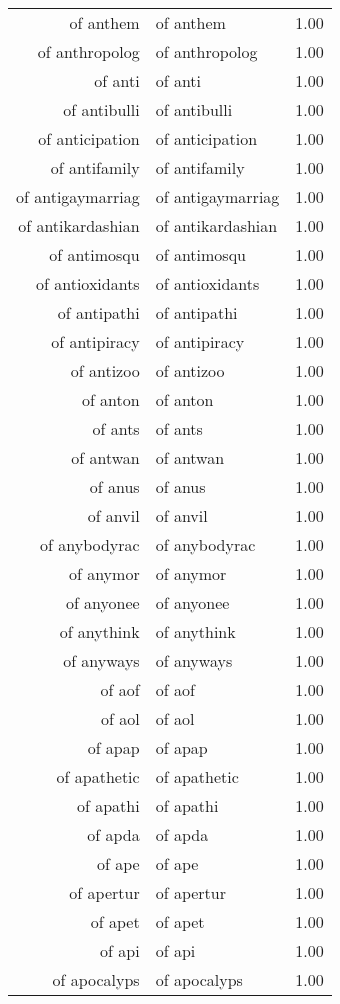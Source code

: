 \begin{table}[ht]
\begin{tabular}{rlr}
  of anthem & of anthem & 1.00 \\ 
  of anthropolog & of anthropolog & 1.00 \\ 
  of anti & of anti & 1.00 \\ 
  of antibulli & of antibulli & 1.00 \\ 
  of anticipation & of anticipation & 1.00 \\ 
  of antifamily & of antifamily & 1.00 \\ 
  of antigaymarriag & of antigaymarriag & 1.00 \\ 
  of antikardashian & of antikardashian & 1.00 \\ 
  of antimosqu & of antimosqu & 1.00 \\ 
  of antioxidants & of antioxidants & 1.00 \\ 
  of antipathi & of antipathi & 1.00 \\ 
  of antipiracy & of antipiracy & 1.00 \\ 
  of antizoo & of antizoo & 1.00 \\ 
  of anton & of anton & 1.00 \\ 
  of ants & of ants & 1.00 \\ 
  of antwan & of antwan & 1.00 \\ 
  of anus & of anus & 1.00 \\ 
  of anvil & of anvil & 1.00 \\ 
  of anybodyrac & of anybodyrac & 1.00 \\ 
  of anymor & of anymor & 1.00 \\ 
  of anyonee & of anyonee & 1.00 \\ 
  of anythink & of anythink & 1.00 \\ 
  of anyways & of anyways & 1.00 \\ 
  of aof & of aof & 1.00 \\ 
  of aol & of aol & 1.00 \\ 
  of apap & of apap & 1.00 \\ 
  of apathetic & of apathetic & 1.00 \\ 
  of apathi & of apathi & 1.00 \\ 
  of apda & of apda & 1.00 \\ 
  of ape & of ape & 1.00 \\ 
  of apertur & of apertur & 1.00 \\ 
  of apet & of apet & 1.00 \\ 
  of api & of api & 1.00 \\ 
  of apocalyps & of apocalyps & 1.00 \\ 

\end{tabular}
\end{table}
